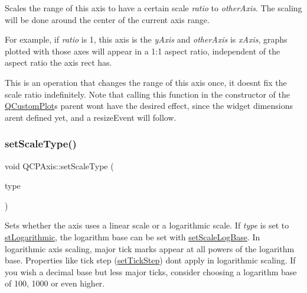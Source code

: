 Scales the range of this axis to have a certain scale {\itshape ratio} to {\itshape other\+Axis}. The scaling will be done around the center of the current axis range.

For example, if {\itshape ratio} is 1, this axis is the {\itshape y\+Axis} and {\itshape other\+Axis} is {\itshape x\+Axis}, graphs plotted with those axes will appear in a 1\+:1 aspect ratio, independent of the aspect ratio the axis rect has.

This is an operation that changes the range of this axis once, it doesn\textquotesingle{}t fix the scale ratio indefinitely. Note that calling this function in the constructor of the \mbox{\hyperlink{class_q_custom_plot}{Q\+Custom\+Plot}}\textquotesingle{}s parent won\textquotesingle{}t have the desired effect, since the widget dimensions aren\textquotesingle{}t defined yet, and a resize\+Event will follow. \mbox{\label{class_q_c_p_axis_adef29cae617af4f519f6c40d1a866ca6}} 
\subsubsection{\texorpdfstring{set\+Scale\+Type()}{setScaleType()}}
{\footnotesize\ttfamily void Q\+C\+P\+Axis\+::set\+Scale\+Type (\begin{DoxyParamCaption}\item[{\mbox{\hyperlink{class_q_c_p_axis_a36d8e8658dbaa179bf2aeb973db2d6f0}{Q\+C\+P\+Axis\+::\+Scale\+Type}}}]{type }\end{DoxyParamCaption})}

Sets whether the axis uses a linear scale or a logarithmic scale. If {\itshape type} is set to \mbox{\hyperlink{class_q_c_p_axis_a36d8e8658dbaa179bf2aeb973db2d6f0abf5b785ad976618816dc6f79b73216d4}{st\+Logarithmic}}, the logarithm base can be set with \mbox{\hyperlink{class_q_c_p_axis_a726186054be90487885a748aa1b42188}{set\+Scale\+Log\+Base}}. In logarithmic axis scaling, major tick marks appear at all powers of the logarithm base. Properties like tick step (\mbox{\hyperlink{class_q_c_p_axis_af727db0acc6492c4c774c0700e738205}{set\+Tick\+Step}}) don\textquotesingle{}t apply in logarithmic scaling. If you wish a decimal base but less major ticks, consider choosing a logarithm base of 100, 1000 or even higher.

